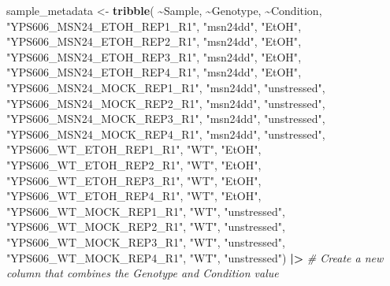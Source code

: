 \documentclass[
]{book}
\newenvironment{Shaded}{\begin{snugshade}}{\end{snugshade}}
\newcommand{\CommentTok}[1]{\textcolor[rgb]{0.56,0.35,0.01}{\textit{#1}}}
\newcommand{\FunctionTok}[1]{\textcolor[rgb]{0.13,0.29,0.53}{\textbf{#1}}}
\newcommand{\NormalTok}[1]{#1}
\newcommand{\OtherTok}[1]{\textcolor[rgb]{0.56,0.35,0.01}{#1}}
\newcommand{\SpecialCharTok}[1]{\textcolor[rgb]{0.81,0.36,0.00}{\textbf{#1}}}
\newcommand{\StringTok}[1]{\textcolor[rgb]{0.31,0.60,0.02}{#1}}
\begin{document}
\begin{Shaded}
\begin{Highlighting}[]
\NormalTok{sample\_metadata }\OtherTok{\textless{}{-}} \FunctionTok{tribble}\NormalTok{(}
  \SpecialCharTok{\textasciitilde{}}\NormalTok{Sample,                      }\SpecialCharTok{\textasciitilde{}}\NormalTok{Genotype,    }\SpecialCharTok{\textasciitilde{}}\NormalTok{Condition,}
  \StringTok{"YPS606\_MSN24\_ETOH\_REP1\_R1"}\NormalTok{,   }\StringTok{"msn24dd"}\NormalTok{,   }\StringTok{"EtOH"}\NormalTok{,}
  \StringTok{"YPS606\_MSN24\_ETOH\_REP2\_R1"}\NormalTok{,   }\StringTok{"msn24dd"}\NormalTok{,   }\StringTok{"EtOH"}\NormalTok{,}
  \StringTok{"YPS606\_MSN24\_ETOH\_REP3\_R1"}\NormalTok{,   }\StringTok{"msn24dd"}\NormalTok{,   }\StringTok{"EtOH"}\NormalTok{,}
  \StringTok{"YPS606\_MSN24\_ETOH\_REP4\_R1"}\NormalTok{,   }\StringTok{"msn24dd"}\NormalTok{,   }\StringTok{"EtOH"}\NormalTok{,}
  \StringTok{"YPS606\_MSN24\_MOCK\_REP1\_R1"}\NormalTok{,   }\StringTok{"msn24dd"}\NormalTok{,   }\StringTok{"unstressed"}\NormalTok{,}
  \StringTok{"YPS606\_MSN24\_MOCK\_REP2\_R1"}\NormalTok{,   }\StringTok{"msn24dd"}\NormalTok{,   }\StringTok{"unstressed"}\NormalTok{,}
  \StringTok{"YPS606\_MSN24\_MOCK\_REP3\_R1"}\NormalTok{,   }\StringTok{"msn24dd"}\NormalTok{,   }\StringTok{"unstressed"}\NormalTok{,}
  \StringTok{"YPS606\_MSN24\_MOCK\_REP4\_R1"}\NormalTok{,   }\StringTok{"msn24dd"}\NormalTok{,   }\StringTok{"unstressed"}\NormalTok{,}
  \StringTok{"YPS606\_WT\_ETOH\_REP1\_R1"}\NormalTok{,      }\StringTok{"WT"}\NormalTok{,        }\StringTok{"EtOH"}\NormalTok{,}
  \StringTok{"YPS606\_WT\_ETOH\_REP2\_R1"}\NormalTok{,      }\StringTok{"WT"}\NormalTok{,        }\StringTok{"EtOH"}\NormalTok{,}
  \StringTok{"YPS606\_WT\_ETOH\_REP3\_R1"}\NormalTok{,      }\StringTok{"WT"}\NormalTok{,        }\StringTok{"EtOH"}\NormalTok{,}
  \StringTok{"YPS606\_WT\_ETOH\_REP4\_R1"}\NormalTok{,      }\StringTok{"WT"}\NormalTok{,        }\StringTok{"EtOH"}\NormalTok{,}
  \StringTok{"YPS606\_WT\_MOCK\_REP1\_R1"}\NormalTok{,      }\StringTok{"WT"}\NormalTok{,        }\StringTok{"unstressed"}\NormalTok{,}
  \StringTok{"YPS606\_WT\_MOCK\_REP2\_R1"}\NormalTok{,      }\StringTok{"WT"}\NormalTok{,        }\StringTok{"unstressed"}\NormalTok{,}
  \StringTok{"YPS606\_WT\_MOCK\_REP3\_R1"}\NormalTok{,      }\StringTok{"WT"}\NormalTok{,        }\StringTok{"unstressed"}\NormalTok{,}
  \StringTok{"YPS606\_WT\_MOCK\_REP4\_R1"}\NormalTok{,      }\StringTok{"WT"}\NormalTok{,        }\StringTok{"unstressed"}\NormalTok{) }\SpecialCharTok{|\textgreater{}}
  \CommentTok{\# Create a new column that combines the Genotype and Condition value}

\end{Highlighting}
\end{Shaded}
\end{document}
